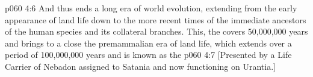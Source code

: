 \vs p060 4:6 \pc And thus ends a long era of world evolution, extending from the early appearance of land life down to the more recent times of the immediate ancestors of the human species and its collateral branches. This, the  covers 50,000,000 years and brings to a close the premammalian era of land life, which extends over a period of 100,000,000 years and is known as the 
\vsetoff
\vs p060 4:7 [Presented by a Life Carrier of Nebadon assigned to Satania and now functioning on Urantia.]
